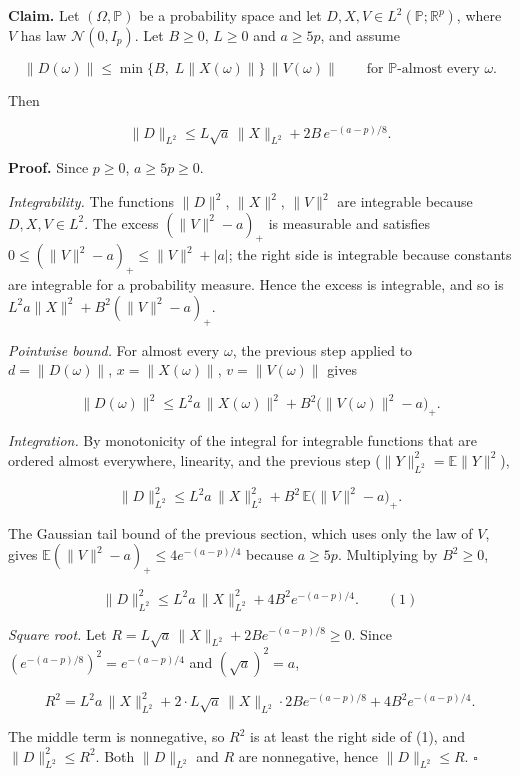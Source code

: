 \documentclass[11pt,a4paper]{article}
\begin{document}
\textbf{Claim.} Let \((\Omega,\mathbb P)\) be a probability space and let \(D,X,V\in L^2(\mathbb P;\mathbb R^p)\), where \(V\) has law \(\mathcal N(0,I_p)\). Let \(B\ge0\), \(L\ge0\) and \(a\ge5p\), and assume


\[\|D(\omega)\|\le\min\{B,\;L\|X(\omega)\|\}\,\|V(\omega)\|\qquad\text{for }\mathbb P\text{-almost every }\omega.\]


Then


\[\|D\|_{L^2}\le L\sqrt a\,\|X\|_{L^2}+2B\,e^{-(a-p)/8}.\]


\textbf{Proof.} Since \(p\ge0\), \(a\ge5p\ge0\).




\emph{Integrability.} The functions \(\|D\|^2\), \(\|X\|^2\), \(\|V\|^2\) are integrable because \(D,X,V\in L^2\). The excess \((\|V\|^2-a)_+\) is measurable and satisfies \(0\le(\|V\|^2-a)_+\le\|V\|^2+|a|\); the right side is integrable because constants are integrable for a probability measure. Hence the excess is integrable, and so is \(L^2a\|X\|^2+B^2(\|V\|^2-a)_+\).




\emph{Pointwise bound.} For almost every \(\omega\), the previous step applied to \(d=\|D(\omega)\|\), \(x=\|X(\omega)\|\), \(v=\|V(\omega)\|\) gives


\[\|D(\omega)\|^2\le L^2a\,\|X(\omega)\|^2+B^2\bigl(\|V(\omega)\|^2-a\bigr)_+.\]


\emph{Integration.} By monotonicity of the integral for integrable functions that are ordered almost everywhere, linearity, and the previous step (\(\|Y\|_{L^2}^2=\mathbb E\|Y\|^2\)),


\[\|D\|_{L^2}^2\le L^2a\,\|X\|_{L^2}^2+B^2\,\mathbb E\bigl(\|V\|^2-a\bigr)_+.\]


The Gaussian tail bound of the previous section, which uses only the law of \(V\), gives \(\mathbb E(\|V\|^2-a)_+\le4e^{-(a-p)/4}\) because \(a\ge5p\). Multiplying by \(B^2\ge0\),


\[\|D\|_{L^2}^2\le L^2a\,\|X\|_{L^2}^2+4B^2e^{-(a-p)/4}.\qquad(1)\]


\emph{Square root.} Let \(R=L\sqrt a\,\|X\|_{L^2}+2Be^{-(a-p)/8}\ge0\). Since \((e^{-(a-p)/8})^2=e^{-(a-p)/4}\) and \((\sqrt a)^2=a\),


\[R^2=L^2a\,\|X\|_{L^2}^2+2\cdot L\sqrt a\,\|X\|_{L^2}\cdot2Be^{-(a-p)/8}+4B^2e^{-(a-p)/4}.\]


The middle term is nonnegative, so \(R^2\) is at least the right side of (1), and \(\|D\|_{L^2}^2\le R^2\). Both \(\|D\|_{L^2}\) and \(R\) are nonnegative, hence \(\|D\|_{L^2}\le R\). \(\square\)
\end{document}
